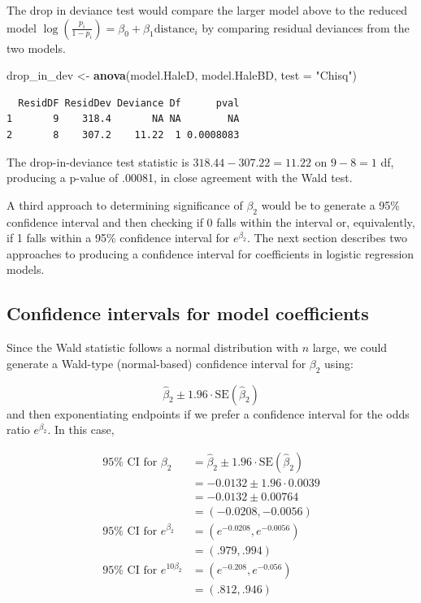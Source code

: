 \documentclass[
]{krantz}
\newenvironment{Shaded}{\begin{snugshade}}{\end{snugshade}}
\newcommand{\DataTypeTok}[1]{\textcolor[rgb]{0.27,0.27,0.27}{#1}}
\newcommand{\KeywordTok}[1]{\textcolor[rgb]{0.27,0.27,0.27}{\textbf{#1}}}
\newcommand{\NormalTok}[1]{#1}
\newcommand{\StringTok}[1]{\textcolor[rgb]{0.5,0.5,0.5}{#1}}
\begin{document}
The drop in deviance test would compare the larger model above to the reduced model \(\log\left(\frac{p_i}{1-p_i}\right) = \beta_0+\beta_1\textrm{distance}_i\) by comparing residual deviances from the two models.

\begin{Shaded}
\begin{Highlighting}[]
\NormalTok{drop_in_dev <-}\StringTok{ }\KeywordTok{anova}\NormalTok{(model.HaleD, model.HaleBD, }\DataTypeTok{test =} \StringTok{"Chisq"}\NormalTok{)}
\end{Highlighting}
\end{Shaded}

\begin{verbatim}
  ResidDF ResidDev Deviance Df      pval
1       9    318.4       NA NA        NA
2       8    307.2    11.22  1 0.0008083
\end{verbatim}

The drop-in-deviance test statistic is \(318.44 - 307.22 = 11.22\) on \(9 - 8 = 1\) df, producing a p-value of .00081, in close agreement with the Wald test.

A third approach to determining significance of \(\beta_2\) would be to generate a 95\% confidence interval and then checking if 0 falls within the interval or, equivalently, if 1 falls within a 95\% confidence interval for \(e^{\beta_2}.\) The next section describes two approaches to producing a confidence interval for coefficients in logistic regression models.

\hypertarget{confidence-intervals-for-model-coefficients}{%
\subsection{Confidence intervals for model coefficients}\label{confidence-intervals-for-model-coefficients}}

Since the Wald statistic follows a normal distribution with \(n\) large, we could generate a Wald-type (normal-based) confidence interval  for \(\beta_2\) using:

\[\hat\beta_2 \pm 1.96\cdot\textrm{SE}(\hat\beta_2)\]
and then exponentiating endpoints if we prefer a confidence interval for the odds ratio \(e^{\beta_2}\). In this case,

\begin{align*}
95\% \textrm{ CI for } \beta_2 &= \hat{\beta}_2 \pm 1.96 \cdot \textrm{SE}(\hat{\beta}_2) \\
                               &= -0.0132 \pm 1.96 \cdot 0.0039 \\
                               &= -0.0132 \pm 0.00764 \\
                               &= (-0.0208, -0.0056) \\
95\% \textrm{ CI for } e^{\beta_2} &= (e^{-0.0208}, e^{-0.0056}) \\
                                   &= (.979, .994) \\
95\% \textrm{ CI for } e^{10\beta_2} &= (e^{-0.208}, e^{-0.056}) \\
                                      &= (.812, .946)
\end{align*}
\end{document}
